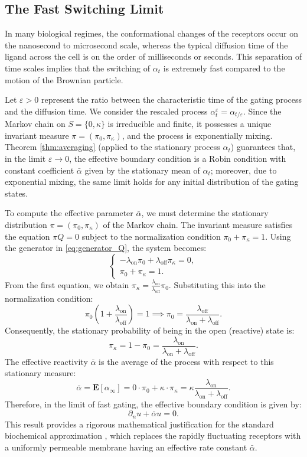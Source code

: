 \documentclass[11pt]{amsart}
\theoremstyle{plain}
\theoremstyle{definition}
\theoremstyle{remark}
\begin{document}
\subsection*{The Fast Switching Limit}
In many biological regimes, the conformational changes of the receptors occur on the nanosecond to microsecond scale, whereas the typical diffusion time of the ligand across the cell is on the order of milliseconds or seconds. This separation of time scales implies that the switching of $\alpha_t$ is extremely fast compared to the motion of the Brownian particle.

Let $\varepsilon > 0$ represent the ratio between the characteristic time of the gating process and the diffusion time. We consider the rescaled process $\alpha^\varepsilon_t = \alpha_{t/\varepsilon}$. Since the Markov chain on $S=\{0, \kappa\}$ is irreducible and finite, it possesses a unique invariant measure $\pi = (\pi_0, \pi_\kappa)$, and the process is exponentially mixing. Theorem \ref{thm:averaging} (applied to the stationary process $\alpha_t$) guarantees that, in the limit $\varepsilon \to 0$, the effective boundary condition is a Robin condition with constant coefficient $\bar\alpha$ given by the stationary mean of $\alpha_t$; moreover, due to exponential mixing, the same limit holds for any initial distribution of the gating states.

To compute the effective parameter $\bar{\alpha}$, we must determine the stationary distribution $\pi = (\pi_0, \pi_\kappa)$ of the Markov chain. The invariant measure satisfies the equation $\pi Q = 0$ subject to the normalization condition $\pi_0 + \pi_\kappa = 1$. Using the generator in \eqref{eq:generator_Q}, the system becomes:
\[
\begin{cases}
	-\lambda_{\text{on}} \pi_0 + \lambda_{\text{off}} \pi_\kappa = 0, \\
	\pi_0 + \pi_\kappa = 1.
\end{cases}
\]
From the first equation, we obtain $\pi_\kappa = \frac{\lambda_{\text{on}}}{\lambda_{\text{off}}} \pi_0$. Substituting this into the normalization condition:
\[
\pi_0 \left( 1 + \frac{\lambda_{\text{on}}}{\lambda_{\text{off}}} \right) = 1 
\implies \pi_0 = \frac{\lambda_{\text{off}}}{\lambda_{\text{on}} + \lambda_{\text{off}}}.
\]
Consequently, the stationary probability of being in the open (reactive) state is:
\[
\pi_\kappa = 1 - \pi_0 = \frac{\lambda_{\text{on}}}{\lambda_{\text{on}} + \lambda_{\text{off}}}.
\]
The effective reactivity $\bar{\alpha}$ is the average of the process with respect to this stationary measure:
\[
\bar{\alpha} = \mathbf{E}[\alpha_\infty] = 0 \cdot \pi_0 + \kappa \cdot \pi_\kappa = \kappa \frac{\lambda_{\text{on}}}{\lambda_{\text{on}} + \lambda_{\text{off}}}.
\]
Therefore, in the limit of fast gating, the effective boundary condition is given by:
\begin{equation}
	\partial_n u + \bar{\alpha} u = 0.
\end{equation}
This result provides a rigorous mathematical justification for the standard biochemical approximation \cite{Zwanzig1990}, which replaces the rapidly fluctuating receptors with a uniformly permeable membrane having an effective rate constant $\bar{\alpha}$.
	
\end{document}
